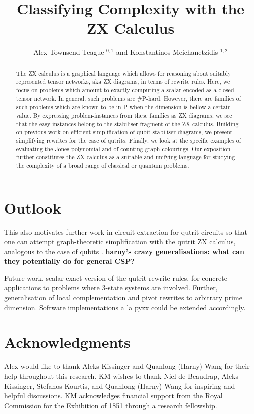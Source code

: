 \documentclass[submission,copyright,creativecommons]{eptcs}
\title{Classifying Complexity with the ZX Calculus}
\author{  Alex Townsend-Teague $^{0,1}$ and Konstantinos Meichanetzidis $^{1,2}$
\institute{$^0$ Mathematical Institute, University of Oxford}
\institute{$^1$ Department of Computer Science, University of Oxford}
\institute{$^2$ Cambridge Quantum Computing Ltd.} }
\begin{document}
\maketitle
\begin{abstract}
The ZX calculus is a graphical language which allows for reasoning about suitably represented tensor networks, aka ZX diagrams,
in terms of rewrite rules.
Here, we focus on problems which amount to exactly computing
a scalar encoded as a closed tensor network.
In general, such problems are \#P-hard.
However, there are families of such problems which are known to be in P
when the dimension is bellow a certain value.
By expressing problem-instances from these families as ZX diagrams,
we see that the easy instances belong to the stabiliser fragment of the ZX calculus.
Building on previous work on efficient simplification of qubit stabiliser diagrams, we present simplifying rewrites for the case of qutrits.
Finally, we look at the specific examples of evaluating the Jones polynomial
and of counting graph-colourings.
Our exposition further constitutes the ZX calculus as a suitable and unifying language for studying the complexity of
a broad range of classical or quantum problems.
\end{abstract}






\section{Outlook}

This also motivates further work in circuit extraction for qutrit circuits so that one can attempt graph-theoretic simplification with the qutrit ZX calculus, analogous to the case of qubits \cite{graph_theoretic_simplification,backens2020again}.
{\bf harny's crazy generalisations: what can they potentially do for general CSP?}

Future work, scalar exact version of the qutrit rewrite rules,
for concrete applications to problems where $3$-state systems are involved.
Further,
generalisation of local complementation and pivot rewrites to arbitrary prime dimension.
Software implementations a la pyzx could be extended accordingly.

\section{Acknowledgments}
Alex would like to thank Aleks Kissinger and Quanlong (Harny) Wang for their help throughout this research.
KM wishes to thank Niel de Beaudrap, Aleks Kissinger, Stefanos 
Kourtis, and Quanlong (Harny) Wang for inspiring and helpful discussions.
KM acknowledges financial support from the Royal Commission for the Exhibition of 1851 through a research fellowship.




\appendix





\end{document}
